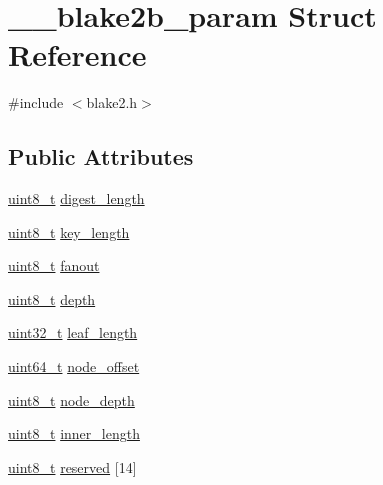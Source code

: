 \hypertarget{struct____blake2b__param}{}\section{\+\_\+\+\_\+blake2b\+\_\+param Struct Reference}
\label{struct____blake2b__param}


{\ttfamily \#include $<$blake2.\+h$>$}

\subsection*{Public Attributes}
\begin{DoxyCompactItemize}
\item 
\hyperlink{stdint_8h_aba7bc1797add20fe3efdf37ced1182c5}{uint8\+\_\+t} \hyperlink{struct____blake2b__param_acf01a39fc0926ef22177a9bda686163f}{digest\+\_\+length}
\item 
\hyperlink{stdint_8h_aba7bc1797add20fe3efdf37ced1182c5}{uint8\+\_\+t} \hyperlink{struct____blake2b__param_af01234225a1b6d0dce3e6c6709af01fa}{key\+\_\+length}
\item 
\hyperlink{stdint_8h_aba7bc1797add20fe3efdf37ced1182c5}{uint8\+\_\+t} \hyperlink{struct____blake2b__param_acb6bd7b19ce82dbfc6968bfaef5ddb31}{fanout}
\item 
\hyperlink{stdint_8h_aba7bc1797add20fe3efdf37ced1182c5}{uint8\+\_\+t} \hyperlink{struct____blake2b__param_ad7bf5379885d9b50022af74eae90a525}{depth}
\item 
\hyperlink{stdint_8h_a435d1572bf3f880d55459d9805097f62}{uint32\+\_\+t} \hyperlink{struct____blake2b__param_a960e7c6fed53742f78acd3b6bcb93c71}{leaf\+\_\+length}
\item 
\hyperlink{stdint_8h_aaa5d1cd013383c889537491c3cfd9aad}{uint64\+\_\+t} \hyperlink{struct____blake2b__param_ada6a88bf4b6f3e08132df538e6c63285}{node\+\_\+offset}
\item 
\hyperlink{stdint_8h_aba7bc1797add20fe3efdf37ced1182c5}{uint8\+\_\+t} \hyperlink{struct____blake2b__param_aa1b2a90e439a538f609032d3bf852751}{node\+\_\+depth}
\item 
\hyperlink{stdint_8h_aba7bc1797add20fe3efdf37ced1182c5}{uint8\+\_\+t} \hyperlink{struct____blake2b__param_a8a299b985fc0aee524628a9863d1839e}{inner\+\_\+length}
\item 
\hyperlink{stdint_8h_aba7bc1797add20fe3efdf37ced1182c5}{uint8\+\_\+t} \hyperlink{struct____blake2b__param_a03f80ec4887f254dabe4baa9626fd5ab}{reserved} \mbox{[}14\mbox{]}
\item 

\end{DoxyCompactItemize}
